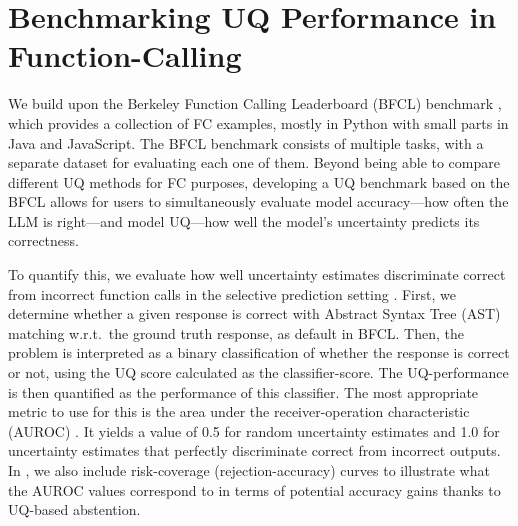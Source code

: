 


% 







\section{Benchmarking UQ Performance in Function-Calling}
\label{sec:benchmark}

We build upon the Berkeley Function Calling Leaderboard (BFCL) benchmark \citep{bfcl}, which provides a collection of FC examples, mostly in Python with small parts in Java and JavaScript.
The BFCL benchmark consists of multiple tasks, with a separate dataset for evaluating each one of them. Beyond being able to compare different UQ methods for FC purposes, developing a UQ benchmark based on the BFCL allows for users to simultaneously evaluate model accuracy---how often the LLM is right---and model UQ---how well the model's uncertainty predicts its correctness. %

To quantify this, we evaluate how well uncertainty estimates discriminate correct from incorrect function calls in the selective prediction setting \citep{el-yaniv2010found}.
First, we determine whether a given response is correct with Abstract Syntax Tree (AST) matching w.r.t.\ the ground truth response, as default in BFCL. 
Then, the problem is interpreted as a binary classification of whether the response is correct or not, using the UQ score calculated as the classifier-score. 
The UQ-performance is then quantified as the performance of this classifier. The most appropriate metric to use for this is
the area under the receiver-operation characteristic (AUROC) \citep{fawcett2006introduction}. 
It yields a value of 0.5 for random uncertainty estimates and 1.0 for uncertainty estimates that perfectly discriminate correct from incorrect outputs. 
In , we also include risk-coverage (rejection-accuracy) curves 
to illustrate what the AUROC values correspond to in terms of potential accuracy gains thanks to UQ-based abstention.



